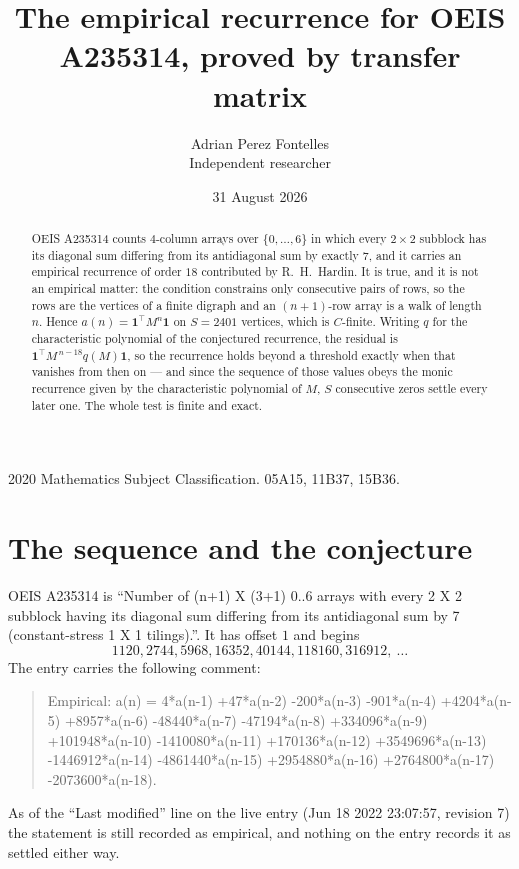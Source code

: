 \documentclass[11pt,a4paper]{article}
\title{The empirical recurrence for OEIS A235314, proved by transfer matrix}
\author{Adrian Perez Fontelles\\ \small Independent researcher}
\date{31 August 2026}
\theoremstyle{plain}
\theoremstyle{definition}
\begin{document}
\maketitle

\begin{abstract}
OEIS A235314 counts $4$-column arrays over $\{0,\dots,6\}$ in which every
$2\times2$ subblock has its diagonal sum differing from its antidiagonal sum by
exactly $7$, and it
carries an empirical recurrence of order $18$ contributed by R.~H.~Hardin. It is true,
and it is not an empirical matter: the condition constrains only consecutive pairs of rows,
so the rows are the vertices of a finite digraph and an $(n+1)$-row array is a walk of
length $n$. Hence $a(n)=\mathbf{1}^{\!\top}M^{n}\mathbf{1}$ on $S=2401$ vertices, which
is $C$-finite. Writing $q$ for the characteristic polynomial of the conjectured recurrence,
the residual is $\mathbf{1}^{\!\top}M^{\,n-18}q(M)\mathbf{1}$, so the recurrence
holds beyond a threshold exactly when that vanishes from then on --- and since the sequence
of those values obeys the monic recurrence given by the characteristic polynomial of $M$,
$S$ consecutive zeros settle every later one. The whole test is finite and exact.
\end{abstract}

\noindent\small 2020 Mathematics Subject Classification. 05A15, 11B37, 15B36.\normalsize

\section{The sequence and the conjecture}

OEIS A235314 is ``Number of (n+1) X (3+1) 0..6 arrays with every 2 X 2 subblock having its diagonal sum differing from its antidiagonal sum by 7 (constant-stress 1 X 1 tilings).''. It has offset
$1$ and begins
\[
1120, 2744, 5968, 16352, 40144, 118160, 316912,\ \dots
\]
The entry carries the following comment:
\begin{quote}\small
Empirical: a(n) = 4*a(n-1) +47*a(n-2) -200*a(n-3) -901*a(n-4) +4204*a(n-5) +8957*a(n-6) -48440*a(n-7) -47194*a(n-8) +334096*a(n-9) +101948*a(n-10) -1410080*a(n-11) +170136*a(n-12) +3549696*a(n-13) -1446912*a(n-14) -4861440*a(n-15) +2954880*a(n-16) +2764800*a(n-17) -2073600*a(n-18).
\end{quote}
As of the ``Last modified'' line on the live entry (Jun 18 2022 23:07:57, revision 7) the statement is
still recorded as empirical, and nothing on the entry records it as settled either way.
\end{document}

